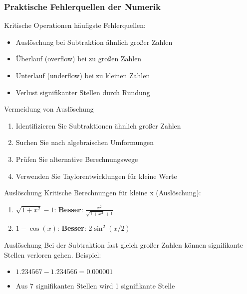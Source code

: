 \subsubsection{Praktische Fehlerquellen der Numerik}

\begin{concept}{Kritische Operationen} häufigste Fehlerquellen:
\begin{itemize}
    \item Auslöschung bei Subtraktion ähnlich großer Zahlen
    \item Überlauf (overflow) bei zu großen Zahlen
    \item Unterlauf (underflow) bei zu kleinen Zahlen
    \item Verlust signifikanter Stellen durch Rundung
\end{itemize}
\end{concept}

\begin{KR}{Vermeidung von Auslöschung}
\begin{enumerate}
    \item Identifizieren Sie Subtraktionen ähnlich großer Zahlen
    \item Suchen Sie nach algebraischen Umformungen
    \item Prüfen Sie alternative Berechnungswege
    \item Verwenden Sie Taylorentwicklungen für kleine Werte
\end{enumerate}
\end{KR}

\begin{example2}{Auslöschung} Kritische Berechnungen für kleine x (Auslöschung):
\begin{enumerate}
    \item $\sqrt{1 + x^2} - 1$: \textbf{Besser}: $\frac{x^2}{\sqrt{1 + x^2} + 1}$
    \item $1 - \cos(x)$: \textbf{Besser}: $2\sin^2(x/2)$
\end{enumerate}
\end{example2}

\begin{remark2}{Auslöschung}
    Bei der Subtraktion fast gleich großer Zahlen können signifikante Stellen verloren gehen. Beispiel:
    \begin{itemize}
        \item $1.234567 - 1.234566 = 0.000001$
        \item Aus 7 signifikanten Stellen wird 1 signifikante Stelle
    \end{itemize}
\end{remark2}

